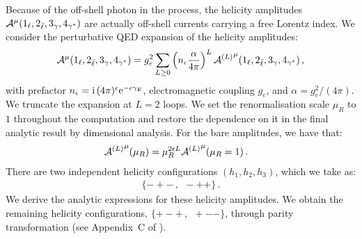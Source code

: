 \documentclass[main.tex]{subfiles}
\begin{document}
Because of the off-shell photon in the process, the helicity amplitudes $\mathcal{A}^{\mu}(1_\ell,2_{\bar\ell},3_\gamma,4_{\gamma^*})$ are actually off-shell currents carrying a free Lorentz index.
We consider the perturbative QED expansion of the helicity amplitudes:
\begin{align} \label{eqQED:loopdecomp}
    \mathcal{A}^{\mu}(1_\ell,2_{\bar\ell},3_\gamma,4_{\gamma^*}) = g_e^2 \sum_{L\ge 0} \left( n_\epsilon \frac{\alpha}{4\pi} \right)^L {\mathcal{A}^{(L)}}^{\mu}(1_\ell,2_{\bar\ell},3_\gamma,4_{\gamma^*}) \,,
\end{align}
with prefactor $n_\epsilon=\mathrm{i}\, (4\pi)^\epsilon \mathrm{e}^{-\epsilon\gamma_E}$, electromagnetic coupling $g_e$, and $\alpha=g_e^2/(4\pi)$.
We truncate the expansion at $L=2$ loops.
We set the renormalisation scale $\mu_R$ to $1$ throughout the computation and restore the dependence on it in the final analytic result by dimensional analysis. For the bare amplitudes, we have that:
\begin{align}
    \label{eqQED:scale-restoration}
    {\mathcal{A}^{(L)}}^{\mu}(\mu_R) &= \mu_R^{2\epsilon L} {\mathcal{A}^{(L)}}^{\mu}(\mu_R=1) \,.
\end{align}
There are two independent helicity configurations $(h_1,h_2,h_3)$, which we take as:
\begin{align} \label{eqQED:helconfs}
    \{-+- \,, \ \ -++\} \,.
\end{align}
We derive the analytic expressions for these helicity amplitudes.
We obtain the remaining helicity configurations, $\{+-+ \,,\ \ +--\}$, through parity transformation (see Appendix~C of ).
\end{document}
